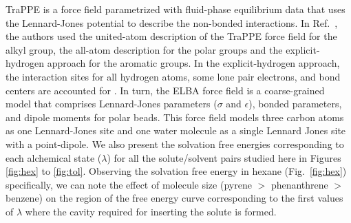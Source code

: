 \documentclass[preprint]{elsarticle}
\begin{document}
	TraPPE is a force field parametrized with fluid-phase equilibrium data that uses the Lennard-Jones potential to describe the non-bonded interactions. In Ref.~, the authors used the united-atom description of the TraPPE force field for the alkyl group, the all-atom description for the polar groups and the explicit-hydrogen approach for the aromatic groups. In the explicit-hydrogen approach, the interaction sites for all hydrogen atoms, some lone pair electrons, and bond centers are accounted for \cite{doi:10.1021/jp073586l}. In turn, the ELBA force field is a coarse-grained model that comprises Lennard-Jones parameters ($\sigma$ and $\epsilon$), bonded parameters, and dipole moments for polar beads. This force field models three carbon atoms as one Lennard-Jones site and one water molecule as a single Lennard Jones site with a point-dipole. We also present the solvation free energies corresponding to each alchemical state ($\lambda$) for all the solute/solvent pairs studied here in Figures \ref{fig:hex} to \ref{fig:tol}. Observing the solvation free energy in hexane (Fig.~\ref{fig:hex}) specifically, we can note the effect of molecule size (pyrene $>$ phenanthrene $>$ benzene) on the region of the free energy curve corresponding to the first values of $\lambda$ where the cavity required for inserting the solute is formed.
	
\end{document}
